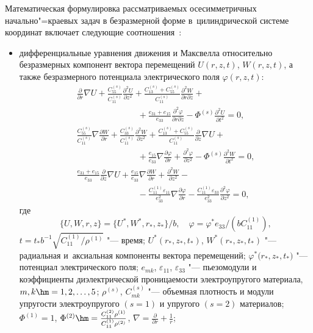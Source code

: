 Математическая формулировка рассматриваемых осесимметричных начально"=краевых задач в безразмерной форме в~цилиндрической системе координат  включает следующие соотношения~\cite{shlya:bib4}:
\begin{itemize}
\item дифференциальные уравнения движения и Максвелла относительно безразмерных компонент 
вектора перемещений $U(r,z,t)$, $W(r,z,t)$, а 
также безразмерного потенциала электрического поля $\varphi (r,z,t)$:
\begin{equation}
\label{shlya:eq1}
\begin{array}{l}
\displaystyle 
\frac{\partial }{\partial r}\nabla U+\frac{C_{55}^{( s )} }{C_{11}^{( s )} }
\frac{\partial ^2U}{\partial z^2}+
\frac{ C_{13}^{( s )} +C_{55}^{( s )} }{C_{11}^{( s )} }
\frac{\partial ^2W}{\partial r\partial z}+
\\[2mm]
\displaystyle \hspace{3cm}
+\frac{ e_{31} +e_{15} }{e_{33}}\frac{\partial ^2\varphi }{\partial r\partial z}-
\Phi^{( s )}\frac{\partial ^2U}{\partial t^2}=0,
\\[2mm]
\displaystyle 
\frac{C_{55}^{( s )} }{C_{11}^{( s )} }\nabla 
\frac{\partial W}{\partial r}+
\frac{C_{33}^{( s )} }{C_{11}^{( s )} } 
\frac{\partial ^2W}{\partial z^2}+
\frac{C_{13}^{( s )} +C_{55}^{( s )} }{C_{11}^{( s )}}\frac{\partial }{\partial z}\nabla U+
\\[2mm]
\displaystyle \hspace{3cm}
+\frac{e_{15} }{e_{33} }\nabla \frac{\partial \varphi }{\partial r}+
\frac{\partial ^2\varphi }{\partial z^2}-\Phi^{( s )}\frac{\partial ^2W}{\partial t^2}=0,
\\[2mm]
\displaystyle 
\frac{  e_{31} +e_{15} }{e_{33}}
\frac{\partial }{\partial  z}\nabla U+\frac{e_{15} }{e_{33} }\nabla 
\frac{\partial W}{\partial r}+\frac{\partial^2W}{\partial z^2}-
\\[2mm]
\displaystyle \hspace{3cm}
- \frac{C_{11}^{( 1 )} \varepsilon _{11}}{e_{33}^2}\nabla \frac{\partial \varphi }{\partial 
r}-
\frac{C_{11}^{( 1 )} \varepsilon _{33}}{e_{33}^2}\frac{\partial^2\varphi }{\partial z^2}=0,
\end{array}
\end{equation}
где 
$$\{U,W,r,z\}= \{U^\ast ,W^\ast ,r_*, z_* \}/b,\quad \varphi =\varphi^\ast e_{33}/(b C_{11}^{( 1 )} ),$$ 
$ t= t_\ast b^{-1} \sqrt{C_{11}^{(1)}/\rho^{(1)}} $ "--- время;
$U^\ast ( r_\ast ,z_\ast ,t_\ast )$, 
$W^\ast (r_\ast,z_\ast ,t_\ast )$ "--- радиальная и~аксиальная компоненты вектора перемещений; 
$\varphi^\ast \big(r_\ast ,z_\ast ,t_\ast \big)$ "--- 
потенциал электрического поля; 
$e_{mk}$, $\varepsilon _{11}$, $\varepsilon_{33}$ "--- пьезомодули и коэффициенты диэлектрической проницаемости 
электроупругого материала, $m ,k\hm =1,2, \dots, 5$; 
$\rho^{( s )}$, $C_{mk}^{( s )}$ "--- объемная плотность и модули  упругости электроупругого $(s=1)$ и упругого $(s=2)$ материалов; 
$\Phi^{( 1 )}=1$, $\Phi^{( 2)}\hm =\tfrac{C_{11}^{( 2 )} \rho ^{( 1 )}}{C_{11}^{( 1 )} 
\rho ^{( 2 )}}$, $\nabla=\frac{\partial }{\partial r}+\frac{1}{r}$;


\end{itemize}
